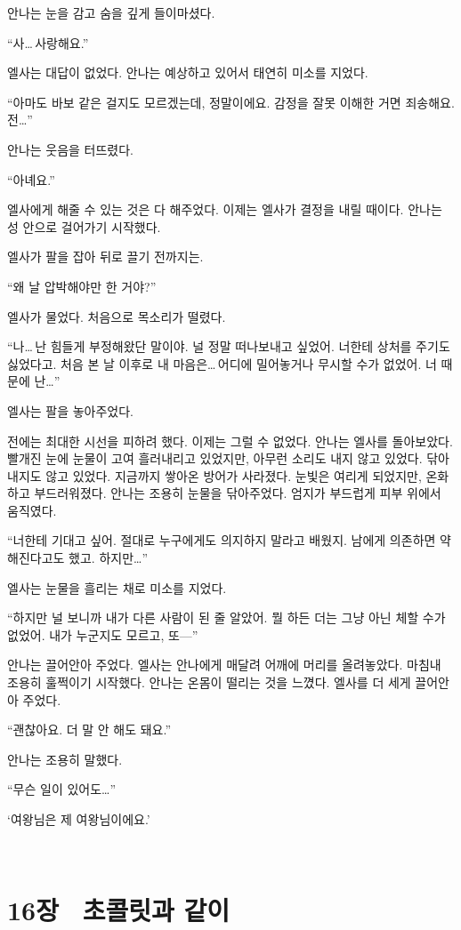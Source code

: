 안나는 눈을 감고 숨을 깊게 들이마셨다.

``사\ldots\,사랑해요.''

엘사는 대답이 없었다. 안나는 예상하고 있어서 태연히 미소를 지었다.

``아마도 바보 같은 걸지도 모르겠는데, 정말이에요. 감정을 잘못 이해한 거면 죄송해요. 전\ldots''

안나는 웃음을 터뜨렸다.

``아녜요.''

엘사에게 해줄 수 있는 것은 다 해주었다. 이제는 엘사가 결정을 내릴 때이다. 안나는 성 안으로 걸어가기 시작했다.

엘사가 팔을 잡아 뒤로 끌기 전까지는.

``왜 날 압박해야만 한 거야?''

엘사가 물었다. 처음으로 목소리가 떨렸다.

``나\ldots\,난 힘들게 부정해왔단 말이야. 널 정말 떠나보내고 싶었어. 너한테 상처를 주기도 싫었다고. 처음 본 날 이후로 내 마음은\ldots\,어디에 밀어놓거나 무시할 수가 없었어. 너 때문에 난\ldots''

엘사는 팔을 놓아주었다.

전에는 최대한 시선을 피하려 했다. 이제는 그럴 수 없었다. 안나는 엘사를 돌아보았다. 빨개진 눈에 눈물이 고여 흘러내리고 있었지만, 아무런 소리도 내지 않고 있었다. 닦아내지도 않고 있었다. 지금까지 쌓아온 방어가 사라졌다. 눈빛은 여리게 되었지만, 온화하고 부드러워졌다. 안나는 조용히 눈물을 닦아주었다. 엄지가 부드럽게 피부 위에서 움직였다.

``너한테 기대고 싶어. 절대로 누구에게도 의지하지 말라고 배웠지. 남에게 의존하면 약해진다고도 했고. 하지만\ldots''

엘사는 눈물을 흘리는 채로 미소를 지었다.

``하지만 널 보니까 내가 다른 사람이 된 줄 알았어. 뭘 하든 더는 그냥 아닌 체할 수가 없었어. 내가 누군지도 모르고, 또—''

안나는 끌어안아 주었다. 엘사는 안나에게 매달려 어깨에 머리를 올려놓았다. 마침내 조용히 훌쩍이기 시작했다. 안나는 온몸이 떨리는 것을 느꼈다. 엘사를 더 세게 끌어안아 주었다.

``괜찮아요. 더 말 안 해도 돼요.''

안나는 조용히 말했다.

``무슨 일이 있어도\ldots''

`여왕님은 제 여왕님이에요.'

﻿

\chapter[16장  초콜릿과 같이][16장\hspace*{.5em}초콜릿과 같이]{16장 \ 초콜릿과 같이}



